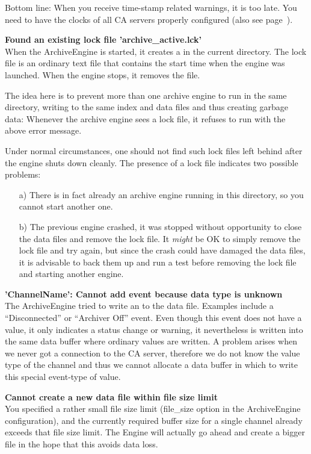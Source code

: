 Bottom line: When you receive time-stamp related warnings, it is too
late. You need to have the clocks of all CA servers properly configured
(also see page~\pageref{back:in:time}).

\noindent
\textbf{Found an existing lock file 'archive\_active.lck'}\\
When the ArchiveEngine is started, it creates a  in
the current directory. The lock file is an ordinary text file
that contains the start time when the engine was launched. When
the engine stops, it removes the file.

The idea here is to prevent more than one archive engine to run
in the same directory, writing to the same index and data files
and thus creating garbage data: Whenever the archive engine sees
a lock file, it refuses to run with the above error message.

Under normal circumstances, one should not find such lock files
left behind after the engine shuts down cleanly. The presence of
a lock file indicates two possible problems:
\begin{enumerate}
\item[a)] There is in fact already an archive engine running in
this directory, so you cannot start another one.
\item[b)] The previous engine crashed, it was stopped without
opportunity to close the data files and remove the lock file.
It \emph{might} be OK to simply remove the lock file and try
again, but since the crash could have damaged the data files, it
is advisable to back them up and run a test before removing the
lock file and starting another engine.
\end{enumerate}

\noindent
\textbf{'ChannelName': Cannot add event because data type is unknown}\\
The ArchiveEngine tried to write an  to the data
file. Examples include a ``Disconnected'' or ``Archiver Off''
event. Even though this event does not have a value, it only
indicates a status change or warning, it nevertheless is written
into the same data buffer where ordinary values are written.
A problem arises when we never got a connection to the CA
server, therefore we do not know the value type of the channel
and thus we cannot allocate a data buffer in which to write this
special event-type of value.

\noindent
\textbf{Cannot create a new data file within file size limit}\\
You specified a rather small file size limit (file\_size option in the
ArchiveEngine configuration), and the currently required buffer size
for a single channel already exceeds that file size limit.
The Engine will actually go ahead and create a bigger file in the hope
that this avoids data loss.

